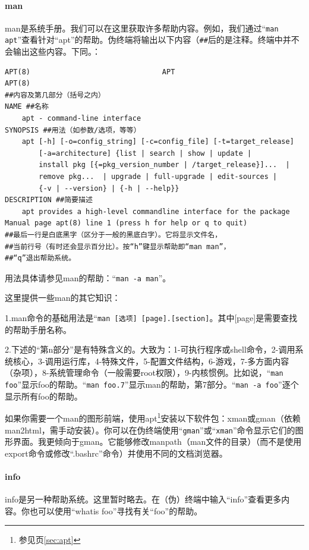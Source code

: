 \paragraph{man}
man是系统手册。我们可以在这里获取许多帮助内容。例如，我们通过“\verb|man apt|”查看针对“apt”的帮助。伪终端将输出以下内容（\verb|##|后的是注释。终端中并不会输出这些内容。下同。：
\begin{verbatim}
APT(8)                               APT                              APT(8)
##内容及第几部分（括号之内）
NAME ##名称
    apt - command-line interface
SYNOPSIS ##用法（如参数/选项，等等）
    apt [-h] [-o=config_string] [-c=config_file] [-t=target_release]
        [-a=architecture] {list | search | show | update |
        install pkg [{=pkg_version_number | /target_release}]...  |
        remove pkg...  | upgrade | full-upgrade | edit-sources |
        {-v | --version} | {-h | --help}}
DESCRIPTION ##简要描述
    apt provides a high-level commandline interface for the package
Manual page apt(8) line 1 (press h for help or q to quit)
##最后一行是白底黑字（区分于一般的黑底白字）。它将显示文件名，
##当前行号（有时还会显示百分比）。按“h”键显示帮助即“man man”，
##“q”退出帮助系统。
\end{verbatim}
用法具体请参见man的帮助：“\verb|man -a man|”。\par 这里提供一些man的其它知识：\par 1.man命令的基础用法是“\verb|man [选项] [page].[section]|。其中[page]是需要查找的帮助手册名称。\par 2.下述的“第n部分”是有特殊含义的。大致为：1-可执行程序或shell命令，2-调用系统核心，3-调用运行库，4-特殊文件，5-配置文件结构，6-游戏，7-多方面内容（杂项），8-系统管理命令（一般需要root权限），9-内核惯例。比如说，“\verb|man foo|”显示foo的帮助。“\verb|man foo.7|”显示man的帮助，第7部分。“\verb|man -a foo|”逐个显示所有foo的帮助。\par
如果你需要一个man的图形前端，使用apt\footnote{参见\pageref{sec:apt}页\ref{sec:apt}}安装以下软件包：xman或gman（依赖man2html，需手动安装）。你可以在伪终端使用“\verb|gman|”或“\verb|xman|”命令显示它们的图形界面。我更倾向于gman。它能够修改manpath（man文件的目录）（而不是使用export命令或修改“.bashrc”命令）并使用不同的文档浏览器。
\paragraph{info}
info是另一种帮助系统。这里暂时略去。在（伪）终端中输入“info”查看更多内容。你也可以使用“whatis foo”寻找有关“foo”的帮助。
